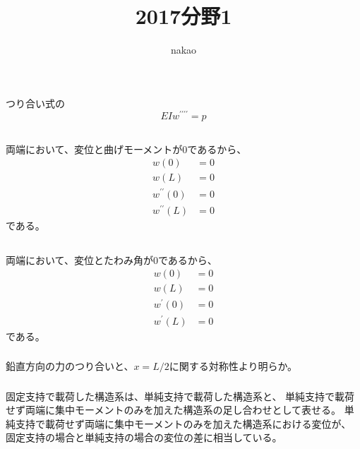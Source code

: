 \documentclass[a4paper]{jsarticle}
\begin{document}
\title{2017分野1}
\author{nakao}
\maketitle

\section{}
\subsection{}
つり合い式の
\begin{equation}
  E I w^{\prime \prime \prime \prime} = p
\end{equation}

\subsection{}
両端において、変位と曲げモーメントが0であるから、
\begin{align}
  w(0) &= 0 \\
  w(L) &= 0 \\
  w^{\prime \prime}(0) &= 0 \\
  w^{\prime \prime}(L) &= 0
\end{align}
である。

\subsection{}
\subsubsection{}
両端において、変位とたわみ角が0であるから、
\begin{align}
  w(0) &= 0 \\
  w(L) &= 0 \\
  w^{\prime}(0) &= 0 \\
  w^{\prime}(L) &= 0
\end{align}
である。

\subsubsection{}
鉛直方向の力のつり合いと、$x = L/2$に関する対称性より明らか。

\subsubsection{}
固定支持で載荷した構造系は、単純支持で載荷した構造系と、
単純支持で載荷せず両端に集中モーメントのみを加えた構造系の足し合わせとして表せる。
単純支持で載荷せず両端に集中モーメントのみを加えた構造系における変位が、
固定支持の場合と単純支持の場合の変位の差に相当している。
\end{document}
